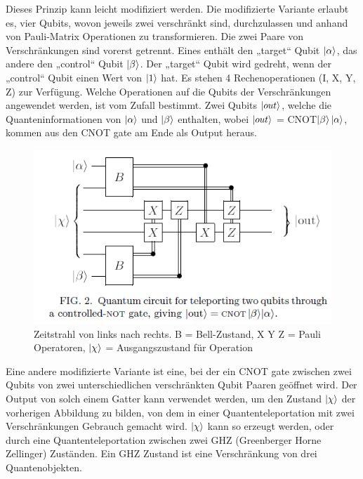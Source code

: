 \newpage
\noindent Dieses Prinzip kann leicht modifiziert werden. Die modifizierte Variante erlaubt es, vier Qubits, wovon jeweils zwei verschränkt sind, durchzulassen und anhand von Pauli-Matrix Operationen zu transformieren. Die zwei Paare von Verschränkungen sind vorerst getrennt. Eines enthält den „target“ Qubit \(\ket{\alpha}\), das andere den „control“ Qubit \(\ket{\beta}\). Der „target“ Qubit wird gedreht, wenn der „control“ Qubit einen Wert von \(\ket{1}\) hat. Es stehen 4 Rechenoperationen (I, X, Y, Z) zur Verfügung. Welche Operationen auf die Qubits der Verschränkungen angewendet werden, ist vom Zufall bestimmt. Zwei Qubits \(\ket{out}\), welche die Quanteninformationen von \(\ket{\alpha}\) und \(\ket{\beta}\) enthalten, wobei \(\ket{out}\) = CNOT\(\ket{\beta}\)\(\ket{\alpha}\), kommen aus den CNOT gate am Ende als Output heraus.\\
\begin{figure}[h!]
    \centering
    \includegraphics[width=1.0\textwidth]{images/quantum-information/quantenteleportation_cnot_2.png}
    \caption{Zeitstrahl von links nach rechts. B = Bell-Zustand, X Y Z = Pauli Operatoren, \(\ket{\chi}\) = Ausgangszustand für Operation}
    \label{fig:meinbild}
\end{figure}
\newpage
\noindent Eine andere modifizierte Variante ist eine, bei der ein CNOT gate zwischen zwei Qubits von zwei unterschiedlichen verschränkten Qubit Paaren geöffnet wird. Der Output von solch einem Gatter kann verwendet werden, um den Zustand \(\ket{\chi}\) der vorherigen Abbildung zu bilden, von dem in einer Quantenteleportation mit zwei Verschränkungen Gebrauch gemacht wird. \(\ket{\chi}\) kann so erzeugt werden, oder durch eine Quantenteleportation zwischen zwei GHZ (Greenberger Horne Zellinger) Zuständen. Ein GHZ Zustand ist eine Verschränkung von drei Quantenobjekten.\\
